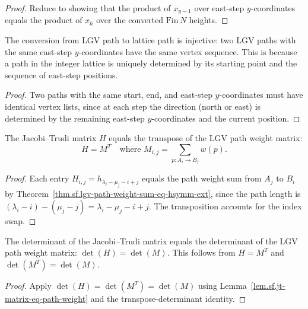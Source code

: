 \begin{proof}
Reduce to showing that the product of $x_{y-1}$ over east-step
$y$-coordinates equals the product of $x_h$ over the converted
$\mathrm{Fin}\,N$ heights.
\end{proof}

\begin{lemma}
\label{lem.sf.lgv-path-to-lattice-path-injective}
\leanhelper
\leanok
The conversion from LGV path to lattice path is injective:
two LGV paths with the same east-step $y$-coordinates have
the same vertex sequence.
This is because a path in the integer lattice is uniquely determined
by its starting point and the sequence of east-step positions.
\end{lemma}

\begin{proof}
Two paths with the same start, end, and east-step $y$-coordinates
must have identical vertex lists, since at each step the direction
(north or east) is determined by the remaining east-step $y$-coordinates
and the current position.
\end{proof}

\begin{lemma}
\label{lem.sf.jt-matrix-eq-path-weight}
\leanhelper
\leanok
The Jacobi--Trudi matrix $H$ equals the transpose of the LGV path weight matrix:
\[
H = M^T \quad \text{where } M_{i,j} = \sum_{p : A_i \to B_j} w(p).
\]
\end{lemma}

\begin{proof}
\leanok
Each entry $H_{i,j} = h_{\lambda_i - \mu_j - i + j}$ equals the
path weight sum from $A_j$ to $B_i$ by
Theorem~\ref{thm.sf.lgv-path-weight-sum-eq-hsymm-ext}, since the path length is
$(\lambda_i - i) - (\mu_j - j) = \lambda_i - \mu_j - i + j$.
The transposition accounts for the index swap.
\end{proof}

\begin{lemma}
\label{lem.sf.jt-det-eq-det-path-weight}
\leanhelper
\leanok
The determinant of the Jacobi--Trudi matrix equals the determinant
of the LGV path weight matrix:
$\det(H) = \det(M)$.
This follows from $H = M^T$ and $\det(M^T) = \det(M)$.
\end{lemma}

\begin{proof}
\leanok
Apply $\det(H) = \det(M^T) = \det(M)$ using
Lemma~\ref{lem.sf.jt-matrix-eq-path-weight} and the
transpose-determinant identity.
\end{proof}

